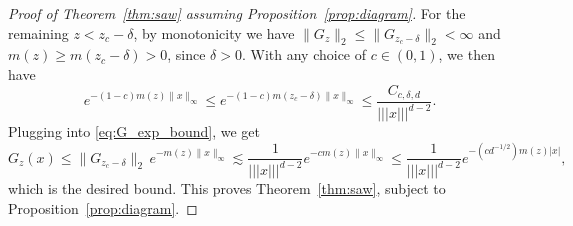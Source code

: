 \documentclass[11pt,hidelinks]{article}
\theoremstyle{plain}
\numberwithin{equation}{section}
\renewcommand{\(}{\left(}
\renewcommand{\)}{\right)}
\newcommand{\1}{\mathds{1}}
\providecommand{\abs}[1]{\lvert#1\rvert}
\providecommand{\norm}[1]{\lVert#1\rVert}
\newcommand{\veee}[1]{|\!|\!|#1|\!|\!|}
\providecommand{\nnnorm}[1]{\veee {#1} }
\begin{document}
\begin{proof}[Proof of Theorem~\ref{thm:saw} assuming Proposition~\ref{prop:diagram}]
For the remaining $z < z_c - \delta$, 
by monotonicity we have $\norm{ G_z }_2  \le \norm{ G_{z_c-\delta} }_2  < \infty$ and $m(z) \ge m(z_c-\delta) > 0$, since $\delta > 0$.
With any choice of $c\in(0,1)$, we then have
\begin{equation}
e^{-(1-c) m(z)\norm x_\infty } 
\le e^{-(1-c) m(z_c - \delta)\norm x_\infty } 
\le \frac {C_{c,\delta,d}} { \nnnorm x^{d-2} }. 
\end{equation}
Plugging into \eqref{eq:G_exp_bound}, we get
\begin{equation} \label{eq:Gz_small}
G_z(x) \le \norm{ G_{z_c-\delta} }_2\, e^{-m(z) \norm x_\infty}
\lesssim \frac 1 { \nnnorm x^{d-2} }  e^{-c m(z)\norm x_\infty }
\le \frac 1 { \nnnorm x^{d-2} }  e^{-(c d^{-1/2}) m(z) \abs x }, 
\end{equation}
which is the desired bound. 
This proves Theorem~\ref{thm:saw}, subject to Proposition~\ref{prop:diagram}.
\end{proof}
\end{document}
